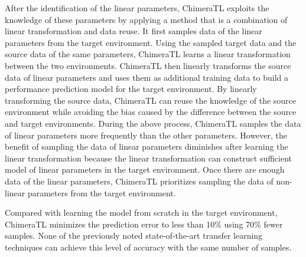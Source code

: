 After the identification of the linear parameters, ChimeraTL exploits the knowledge of these parameters by applying a method that is a combination of linear transformation and data reuse.
It first samples data of the linear parameters from the target environment.
Using the sampled target data and the source data of the same parameters, ChimeraTL learns a linear transformation between the two environments.
ChimeraTL then linearly transforms the source data of linear parameters and uses them as additional training data to build a performance prediction model for the target environment.
By linearly transforming the source data, ChimeraTL can reuse the knowledge of the source environment while avoiding the bias caused by the difference between the source and target environments. 
During the above process, ChimeraTL samples the data of linear parameters more frequently than the other parameters.
However, the benefit of sampling the data of linear parameters diminishes after learning the linear transformation because the linear transformation can construct sufficient model of linear parameters in the target environment.
Once there are enough data of the linear parameters, ChimeraTL prioritizes sampling the data of non-linear parameters from the target environment.

Compared with learning the model from scratch in the target environment, ChimeraTL minimizes the prediction error to less than 10\% using 70\% fewer samples. None of the previously noted state-of-the-art transfer learning techniques\cite{l2s,Valov,datareuse} can achieve this level of accuracy with the same number of samples. 


